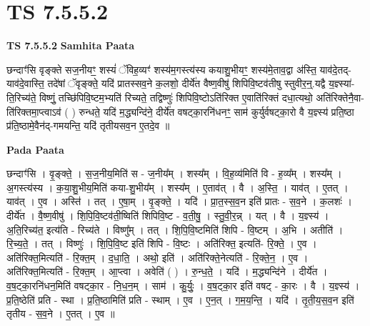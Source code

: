 \documentclass[17pt]{extarticle}
\begin{document}
\section*{ TS 7.5.5.2 }

\textbf{TS 7.5.5.2 } \newline
\textbf{Samhita Paata} \newline

छन्दाꣳ॑सि वृङ्क्ते सज॒नीयꣳ॒॒ शस्यं॑ ॅविह॒व्यꣳ॑ शस्य॑म॒गस्त्य॑स्य कयाशु॒भीयꣳ॒॒ शस्य॑मे॒ताव॒द्वा अ॑स्ति॒ याव॑दे॒तद्-याव॑दे॒वास्ति॒ तदे॑षां ॅवृङ्क्ते॒ यदि॑ प्रातस्सव॒ने क॒लशो॒ दीर्ये॑त वैष्ण॒वीषु॑ शिपिवि॒ष्टव॑तीषु स्तुवीर॒न्॒.यद्वै य॒ज्ञ्स्या॑-ति॒रिच्य॑ते॒ विष्णुं॒ तच्छि॑पिवि॒ष्टम॒भ्यति॑ रिच्यते॒ तद्विष्णुः॑ शिपिवि॒ष्टोऽति॑रिक्त ए॒वाति॑रिक्तं दधा॒त्यथो॒ अति॑रिक्तेनै॒वा-ति॑रिक्तमा॒प्त्वाऽव॑ ( ) रुन्धते॒ यदि॑ म॒द्ध्यन्दि॑ने॒ दीर्ये॑त वषट्का॒रनि॑धनꣳ॒॒ साम॑ कुर्युर्वषट्का॒रो वै य॒ज्ञ्स्य॑ प्रति॒ष्ठा प्र॑ति॒ष्ठामे॒वैन॑द्-गमयन्ति॒ यदि॑ तृतीयसव॒न ए॒तदे॒व ॥ \newline

\textbf{Pada Paata} \newline

छन्दाꣳ॑सि । वृ॒ङ्क्ते॒ । स॒ज॒नीय॒मिति॑ स - ज॒नीय᳚म् । शस्य᳚म् । वि॒ह॒व्य॑मिति॑ वि - ह॒व्य᳚म् । शस्य᳚म् । अ॒गस्त्य॑स्य । क॒या॒शु॒भीय॒मिति॑ कया-शु॒भीय᳚म् । शस्य᳚म् । ए॒ताव॑त् । वै । अ॒स्ति॒ । याव॑त् । ए॒तत् । याव॑त् । ए॒व । अस्ति॑ । तत् । ए॒षा॒म् । वृ॒ङ्क्ते॒ । यदि॑ । प्रा॒त॒स्स॒व॒न इति॑ प्रातः - स॒व॒ने । क॒लशः॑ । दीर्ये॑त । वै॒ष्ण॒वीषु॑ । शि॒पि॒वि॒ष्टव॑ती॒ष्विति॑ शिपिवि॒ष्ट - व॒ती॒षु॒ । स्तु॒वी॒र॒न्न् । यत् । वै । य॒ज्ञ्स्य॑ । अ॒ति॒रिच्य॑त॒ इत्य॑ति - रिच्य॑ते । विष्णु᳚म् । तत् । शि॒पि॒वि॒ष्टमिति॑ शिपि - वि॒ष्टम् । अ॒भि । अतीति॑ । रि॒च्य॒ते॒ । तत् । विष्णुः॑ । शि॒पि॒वि॒ष्ट इति॑ शिपि - वि॒ष्टः । अति॑रिक्त॒ इत्यति॑- रि॒क्ते॒ । ए॒व । अति॑रिक्त॒मित्यति॑ - रि॒क्त॒म् । द॒धा॒ति॒ । अथो॒ इति॑ । अति॑रिक्ते॒नेत्यति॑ - रि॒क्ते॒न॒ । ए॒व । अति॑रिक्त॒मित्यति॑ - रि॒क्त॒म् । आ॒प्त्वा । अवेति॑ ( ) । रु॒न्ध॒ते॒ । यदि॑ । म॒द्ध्यन्दि॑ने । दीर्ये॑त । व॒ष॒ट्का॒रनि॑धन॒मिति॑ वषट्का॒र - नि॒ध॒न॒म् । साम॑ । कु॒र्युः॒ । व॒ष॒ट्का॒र इति॑ वषट् - का॒रः । वै । य॒ज्ञ्स्य॑ । प्र॒ति॒ष्ठेति॑ प्रति - स्था । प्र॒ति॒ष्ठामिति॑ प्रति - स्थाम् । ए॒व । ए॒न॒त् । ग॒म॒य॒न्ति॒ । यदि॑ । तृ॒ती॒य॒स॒व॒न इति॑ तृतीय - स॒व॒ने । ए॒तत् । ए॒व ॥  \newline




\end{document}
